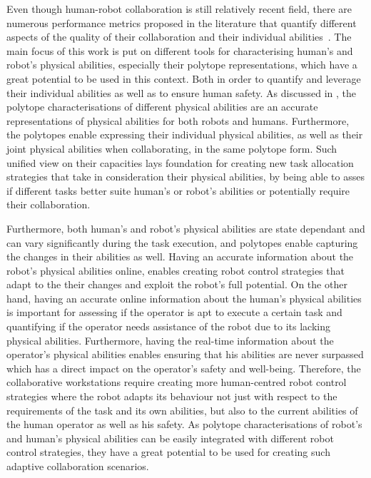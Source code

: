 
Even though human-robot collaboration is still relatively recent field, there are numerous performance metrics proposed in the literature that quantify different aspects of the quality of their collaboration and their individual abilities~\cite{CORONADO2022collab_quality}.
The main focus of this work is put on different tools for characterising human's and robot's physical abilities, especially their polytope representations, which have a great potential to be used in this context. Both in order to quantify and leverage their individual abilities as well as to ensure human safety. As discussed in , the polytope characterisations of different physical abilities are an accurate representations of physical abilities for both robots and humans. Furthermore, the polytopes enable expressing their individual physical abilities, as well as their joint physical abilities when collaborating, in the same polytope form. Such unified view on their capacities lays foundation for creating new task allocation strategies that take in consideration their physical abilities, by being able to asses if different tasks better suite human's or robot's abilities or potentially require their collaboration. 

Furthermore, both human's and robot's physical abilities are state dependant and can vary significantly during the task execution, and polytopes enable capturing the changes in their abilities as well. Having an accurate information about the robot's physical abilities online, enables creating robot control strategies that adapt to the their changes and exploit the robot's full potential. On the other hand, having an accurate online information about the human's physical abilities is important for assessing if the operator is apt to execute a certain task and quantifying if the operator needs assistance of the robot due to its lacking physical abilities. Furthermore, having the real-time information about the operator's physical abilities enables ensuring that his abilities are never surpassed which has a direct impact on the operator's safety and well-being. Therefore, the collaborative workstations require creating more human-centred robot control strategies where the robot adapts its behaviour not just with respect to the requirements of the task and its own abilities, but also to the current abilities of the human operator as well as his safety. As polytope characterisations of robot's and human's physical abilities can be easily integrated with different robot control strategies, they have a great potential to be used for creating such adaptive collaboration scenarios.
